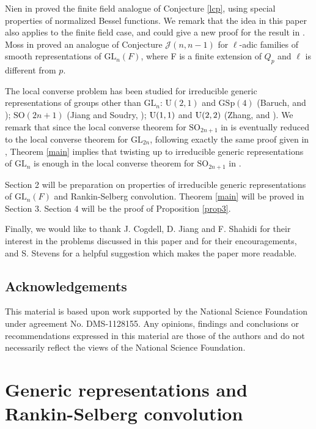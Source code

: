 \documentclass[12pt]{amsart}
\begin{document}
Nien in \cite{N14} proved the finite field analogue of Conjecture \ref{lcp}, using special properties of normalized Bessel functions. We remark that the idea in this paper also applies to the finite field case, and could give a new proof for the result in \cite{N14}. Moss in \cite{M15} proved an analogue of Conjecture ${{\mathcal {J}}}(n,n-1)$ for $\ell$-adic families of smooth representations of ${{\mathrm{GL}}}_n(F)$, where F is a finite extension of $Q_p$ and $\ell$ is different from $p$. 

The local converse problem has been studied for irreducible generic representations of groups other than ${{\mathrm{GL}}}_n$: $\mathrm{U}(2,1)$ and $\mathrm{GSp}(4)$ (Baruch,  \cite{B95} and \cite{B97}); ${{\mathrm{SO}}}(2n+1)$ (Jiang and Soudry,  \cite{JS03}); $\rm{U}(1,1)$ and $\rm{U}(2,2)$ (Zhang, \cite{Z15a} and \cite{Z15b}). 
We remark that since the local converse theorem for ${{\mathrm{SO}}}_{2n+1}$ in \cite{JS03} is eventually reduced to the local converse theorem for ${{\mathrm{GL}}}_{2n}$, following exactly the same proof given in \cite{JS03}, Theorem \ref{main} implies that twisting up to irreducible generic representations of ${{\mathrm{GL}}}_n$ is enough in the local converse theorem for ${{\mathrm{SO}}}_{2n+1}$ in \cite{JS03}.  

Section 2 will be preparation on properties of irreducible generic representations of ${{\mathrm{GL}}}_n(F)$ and Rankin-Selberg convolution. Theorem \ref{main} will be proved in Section 3.
Section 4 will be the proof of Proposition \ref{prop3}. 

Finally, we would like to thank J. Cogdell, D. Jiang and F. Shahidi for their interest in the problems discussed in
this paper and for their encouragements, and S. Stevens for a helpful suggestion which makes the paper more readable.  

\subsection*{Acknowledgements} This material is based upon work supported by the National Science Foundation under agreement No. DMS-1128155. Any opinions, findings and conclusions or recommendations expressed in this material are those of the authors and do not necessarily reflect the views of the National Science Foundation.

\section{Generic representations and Rankin-Selberg convolution}
\end{document}
